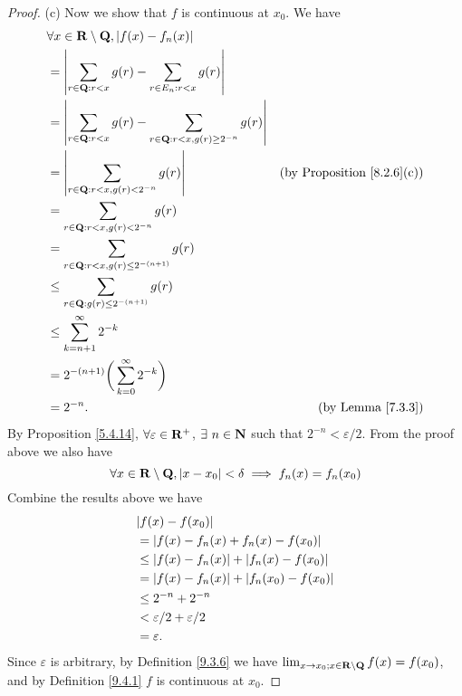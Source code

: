 \begin{proof}{(c)}
    Now we show that \(f\) is continuous at \(x_0\).
    We have
    \begin{align*}
         & \forall x \in \mathbf{R} \setminus \mathbf{Q}, \left\lvert f(x) - f_n(x)\right\rvert                                                                             \\
         & = \left\lvert\sum_{r \in \mathbf{Q} : r < x} g(r) - \sum_{r \in E_n : r < x} g(r)\right\rvert                                                           \\
         & = \left\lvert\sum_{r \in \mathbf{Q} : r < x} g(r) - \sum_{r \in \mathbf{Q} : r < x, g(r) \geq 2^{-n}} g(r)\right\rvert                                          \\
         & = \left\lvert\sum_{r \in \mathbf{Q} : r < x, g(r) < 2^{-n}} g(r)\right\rvert                                   & \text{(by Proposition \ref{8.2.6}(c))} \\
         & = \sum_{r \in \mathbf{Q} : r < x, g(r) < 2^{-n}} g(r)                                                                                  \\
         & = \sum_{r \in \mathbf{Q} : r < x, g(r) \leq 2^{-(n + 1)}} g(r)                                                                         \\
         & \leq \sum_{r \in \mathbf{Q} : g(r) \leq 2^{-(n + 1)}} g(r)                                                                             \\
         & \leq \sum_{k = n + 1}^\infty 2^{-k}                                                                                            \\
         & = 2^{-(n + 1)} \bigg(\sum_{k = 0}^\infty 2^{-k}\bigg)                                                                          \\
         & = 2^{-n}.                                                                             & \text{(by Lemma \ref{7.3.3})}
    \end{align*}
    By Proposition \ref{5.4.14}, \(\forall \varepsilon \in \mathbf{R}^+\), \(\exists\ n \in \mathbf{N}\) such that \(2^{-n} < \varepsilon / 2\).
    From the proof above we also have
    \[
        \forall x \in \mathbf{R} \setminus \mathbf{Q}, \left\lvert x - x_0\right\rvert < \delta \implies f_n(x) = f_n(x_0) \\
    \]
    Combine the results above we have
    \begin{align*}
         & \abs{f(x) - f(x_0)}                              \\
         & = \abs{f(x) - f_n(x) + f_n(x) - f(x_0)}          \\
         & \leq \abs{f(x) - f_n(x)} + \abs{f_n(x) - f(x_0)} \\
         & = \abs{f(x) - f_n(x)} + \abs{f_n(x_0) - f(x_0)}  \\
         & \leq 2^{-n} + 2^{-n}                             \\
         & < \varepsilon / 2 + \varepsilon / 2              \\
         & = \varepsilon.
    \end{align*}
    Since \(\varepsilon\) is arbitrary, by Definition \ref{9.3.6} we have \(\lim_{x \to x_0 ; x \in \mathbf{R} \setminus \mathbf{Q}} f(x) = f(x_0)\), and by Definition \ref{9.4.1} \(f\) is continuous at \(x_0\).
\end{proof}